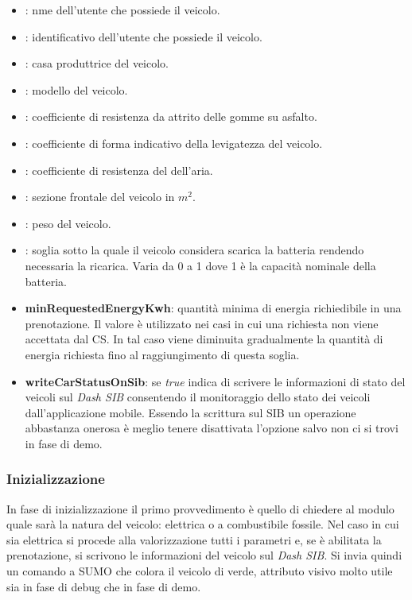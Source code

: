 \begin{itemize}
	\item {}: nme dell'utente che possiede il veicolo.
	\item {}: identificativo dell'utente che possiede il veicolo.
	\item {}: casa produttrice del veicolo.
	\item {}: modello del veicolo.
	\item {}: coefficiente di resistenza da attrito delle gomme su asfalto.
	\item {}: coefficiente di forma indicativo della levigatezza del veicolo.
	\item {}: coefficiente di resistenza del dell'aria.
	\item {}: sezione frontale del veicolo in $m^2$.
	\item {}: peso del veicolo.
	\item {}: soglia sotto la quale il veicolo considera scarica la batteria rendendo necessaria la ricarica. Varia da 0 a 1 dove 1 è la capacità nominale della batteria.
	\item \textbf{minRequestedEnergyKwh}: quantità minima di energia richiedibile in una prenotazione. Il valore è utilizzato nei casi in cui una richiesta non viene accettata dal CS. In tal caso viene diminuita gradualmente la quantità di energia richiesta fino al raggiungimento di questa soglia.
	\item \textbf{writeCarStatusOnSib}: se \emph{true} indica di scrivere le informazioni di stato del veicoli sul \emph{Dash SIB} consentendo il monitoraggio dello stato dei veicoli dall'applicazione mobile. Essendo la scrittura sul SIB un operazione abbastanza onerosa è meglio tenere disattivata l'opzione salvo non ci si trovi in fase di demo.
\end{itemize}


\subsubsection{Inizializzazione}

In fase di inizializzazione il primo provvedimento è quello di chiedere al modulo  quale sarà la natura del veicolo: elettrica o a combustibile fossile. Nel caso in cui sia elettrica si procede alla valorizzazione tutti i parametri e, se è abilitata la prenotazione, si scrivono le informazioni del veicolo sul \emph{Dash SIB}. Si invia quindi un comando a SUMO che colora il veicolo di verde, attributo visivo molto utile sia in fase di debug che in fase di demo.

